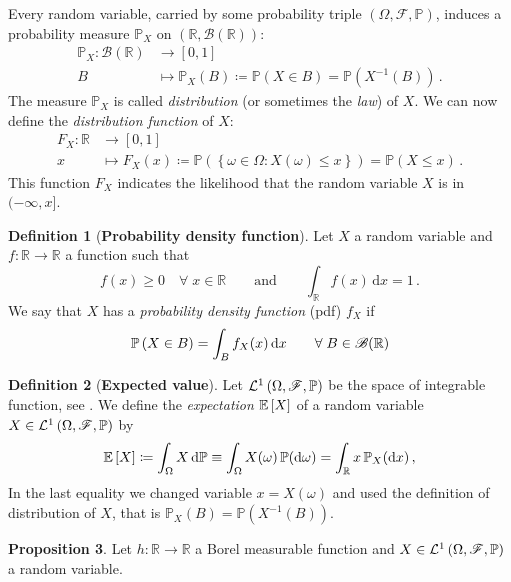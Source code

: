 \documentclass[10pt,a4paper]{book}
\theoremstyle{definition}
\newtheorem{defin}{Definition}[chapter]
\newtheorem{prop}[defin]{Proposition}
\begin{document}
\begin{appendices}
\noindent
Every random variable, carried by some probability triple $(\Omega,\mathscr{F},\mathbb{P})$, induces a probability measure $\mathbb{P}_X$ on $(\mathbb{R},\mathscr{B}(\mathbb{R}))$:
\begin{align*}
\mathbb{P}_X\colon \mathscr{B}(\mathbb{R}) &\to [0,1] \\
B &\mapsto \mathbb{P}_X(B)\coloneqq\mathbb{P}(X\in B)=\mathbb{P}(X^{-1}(B))\,.
\end{align*}
The measure $\mathbb{P}_X$ is called \emph{distribution} (or sometimes the \emph{law}) of $X$.
We can now define the \emph{distribution function} of $X$:
\begin{align*}
F_X\colon \mathbb{R} &\to[0,1] \\ 
x &\mapsto F_X(x) \coloneqq \mathbb{P}\left( \left\lbrace \omega\in\Omega\colon X(\omega)\leq x \right\rbrace \right)=\mathbb{P}\left( X\leq x\right)\,.
\end{align*}
This function $F_X$ indicates the likelihood that the random variable $X$ is in $(-\infty,x]$.

\begin{defin}[\textbf{Probability density function}]
Let $X$ a random variable and $f:\mathbb{R}\to\mathbb{R}$ a function such that 
\[ f(x)\geq 0 \quad\forall\; x\in\mathbb{R} \qquad\mathrm{and}\qquad \int_{\mathbb{R}	}f(x)\,\mbox{d}x=1\,.\]
We say that $X$ has a \emph{probability density function} (pdf) $f_X$ if 
\[ \mathbb{P}\left(X\in B\right)=\int_Bf_X(x)\,\mbox{d}x \qquad \forall\; B\in\mathscr{B}(\mathbb{R}) \]
\end{defin}

\begin{defin}[\textbf{Expected value}]\label{Def:E[...]}
Let $\mathcal{L}^1\left(\Omega,\mathscr{F},\mathbb{P}\right)$ be the space of integrable function, see \cite[p. 54]{Williams1991}.
We define the \emph{expectation} $\mathbb{E}\left[X\right]$ of a random variable $X\in \mathcal{L}^1\left(\Omega,\mathscr{F},\mathbb{P}\right)$ by 
\begin{equation*} 
\mathbb{E}\left[X\right]\coloneqq \int_{\Omega}X\,\mbox{d}\mathbb{P} \equiv \int_{\Omega}X(\omega)\,\mathbb{P}(\mbox{d}\omega) = \int_{\mathbb{R}}x\,\mathbb{P}_X(\mbox{d} x)\,, 
\end{equation*}
In the last equality we changed variable $x=X(\omega)$ and used the definition of distribution of $X$, that is $\mathbb{P}_X(B)=\mathbb{P}(X^{-1}(B))$.
\end{defin}

\begin{prop}
Let $h:\mathbb{R}\to\mathbb{R}$ a Borel measurable function and $X\in \mathcal{L}^1\left(\Omega,\mathscr{F},\mathbb{P}\right)$ a random variable.


\end{prop}
\end{appendices}
\end{document}
